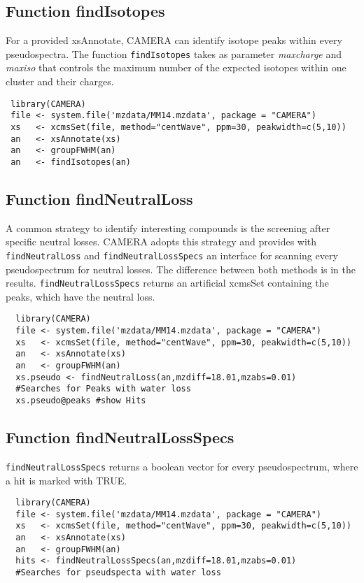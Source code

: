 \documentclass[a4paper,12pt]{article}
\newcommand{\Rfunction}[1]{{\texttt{#1}}}
\newcommand{\Rfunarg}[1]{{\textit{#1}}}
\begin{document}
\subsection{Function findIsotopes}
\label{sec:findIsotopes}
For a provided xsAnnotate, CAMERA can identify isotope peaks within every
pseudospectra. The function \Rfunction{findIsotopes} takes as parameter
\Rfunarg{maxcharge} and \Rfunarg{maxiso} that controls the maximum number of
the expected isotopes within one cluster and their charges.

\begin{verbatim}
 library(CAMERA)
 file <- system.file('mzdata/MM14.mzdata', package = "CAMERA")
 xs   <- xcmsSet(file, method="centWave", ppm=30, peakwidth=c(5,10))
 an   <- xsAnnotate(xs)
 an   <- groupFWHM(an)
 an   <- findIsotopes(an)
\end{verbatim}

\subsection{Function findNeutralLoss}
\label{sec:findNeutralLoss}
A common strategy to identify interesting compounds is the screening after
specific neutral losses. CAMERA adopts this strategy and provides with
\Rfunction{findNeutralLoss} and \Rfunction{findNeutralLossSpecs} an interface
for scanning every pseudospectrum for neutral losses. The difference between
both methods is in the results. \Rfunction{findNeutralLossSpecs} returns an
artificial xcmsSet containing the peaks, which have the neutral loss. 
\begin{verbatim}
  library(CAMERA)
  file <- system.file('mzdata/MM14.mzdata', package = "CAMERA")
  xs   <- xcmsSet(file, method="centWave", ppm=30, peakwidth=c(5,10))
  an   <- xsAnnotate(xs)
  an   <- groupFWHM(an)
  xs.pseudo <- findNeutralLoss(an,mzdiff=18.01,mzabs=0.01) 
  #Searches for Peaks with water loss
  xs.pseudo@peaks #show Hits

\end{verbatim}

\subsection{Function findNeutralLossSpecs}
\label{sec:findNeutralLossSpecs}
\Rfunction{findNeutralLossSpecs} returns 
a boolean vector for every pseudospectrum, where a hit is marked with TRUE.
\begin{verbatim}
  library(CAMERA)
  file <- system.file('mzdata/MM14.mzdata', package = "CAMERA")
  xs   <- xcmsSet(file, method="centWave", ppm=30, peakwidth=c(5,10))
  an   <- xsAnnotate(xs)
  an   <- groupFWHM(an)
  hits <- findNeutralLossSpecs(an,mzdiff=18.01,mzabs=0.01) 
  #Searches for pseudspecta with water loss
\end{verbatim}
\end{document}
